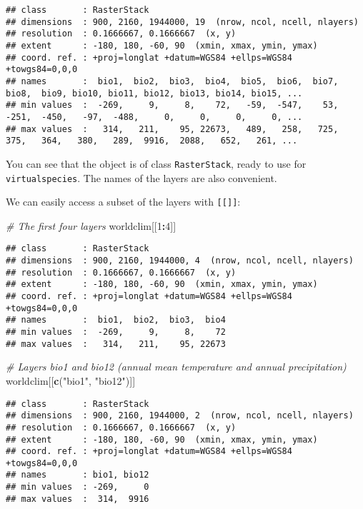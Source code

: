 \documentclass[]{article}
\newenvironment{Shaded}{\begin{snugshade}}{\end{snugshade}}
\newcommand{\KeywordTok}[1]{\textcolor[rgb]{0.13,0.29,0.53}{\textbf{#1}}}
\newcommand{\DecValTok}[1]{\textcolor[rgb]{0.00,0.00,0.81}{#1}}
\newcommand{\StringTok}[1]{\textcolor[rgb]{0.31,0.60,0.02}{#1}}
\newcommand{\CommentTok}[1]{\textcolor[rgb]{0.56,0.35,0.01}{\textit{#1}}}
\newcommand{\OperatorTok}[1]{\textcolor[rgb]{0.81,0.36,0.00}{\textbf{#1}}}
\newcommand{\NormalTok}[1]{#1}
\begin{document}
\begin{verbatim}
## class       : RasterStack 
## dimensions  : 900, 2160, 1944000, 19  (nrow, ncol, ncell, nlayers)
## resolution  : 0.1666667, 0.1666667  (x, y)
## extent      : -180, 180, -60, 90  (xmin, xmax, ymin, ymax)
## coord. ref. : +proj=longlat +datum=WGS84 +ellps=WGS84 +towgs84=0,0,0 
## names       :  bio1,  bio2,  bio3,  bio4,  bio5,  bio6,  bio7,  bio8,  bio9, bio10, bio11, bio12, bio13, bio14, bio15, ... 
## min values  :  -269,     9,     8,    72,   -59,  -547,    53,  -251,  -450,   -97,  -488,     0,     0,     0,     0, ... 
## max values  :   314,   211,    95, 22673,   489,   258,   725,   375,   364,   380,   289,  9916,  2088,   652,   261, ...
\end{verbatim}

You can see that the object is of class \texttt{RasterStack}, ready to
use for \texttt{virtualspecies}. The names of the layers are also
convenient.

We can easily access a subset of the layers with \texttt{{[}{[}{]}{]}}:

\begin{Shaded}
\begin{Highlighting}[]
\CommentTok{# The first four layers}
\NormalTok{worldclim[[}\DecValTok{1}\OperatorTok{:}\DecValTok{4}\NormalTok{]]}
\end{Highlighting}
\end{Shaded}

\begin{verbatim}
## class       : RasterStack 
## dimensions  : 900, 2160, 1944000, 4  (nrow, ncol, ncell, nlayers)
## resolution  : 0.1666667, 0.1666667  (x, y)
## extent      : -180, 180, -60, 90  (xmin, xmax, ymin, ymax)
## coord. ref. : +proj=longlat +datum=WGS84 +ellps=WGS84 +towgs84=0,0,0 
## names       :  bio1,  bio2,  bio3,  bio4 
## min values  :  -269,     9,     8,    72 
## max values  :   314,   211,    95, 22673
\end{verbatim}

\begin{Shaded}
\begin{Highlighting}[]
\CommentTok{# Layers bio1 and bio12 (annual mean temperature and annual precipitation)}
\NormalTok{worldclim[[}\KeywordTok{c}\NormalTok{(}\StringTok{"bio1"}\NormalTok{, }\StringTok{"bio12"}\NormalTok{)]]}
\end{Highlighting}
\end{Shaded}

\begin{verbatim}
## class       : RasterStack 
## dimensions  : 900, 2160, 1944000, 2  (nrow, ncol, ncell, nlayers)
## resolution  : 0.1666667, 0.1666667  (x, y)
## extent      : -180, 180, -60, 90  (xmin, xmax, ymin, ymax)
## coord. ref. : +proj=longlat +datum=WGS84 +ellps=WGS84 +towgs84=0,0,0 
## names       : bio1, bio12 
## min values  : -269,     0 
## max values  :  314,  9916
\end{verbatim}
\end{document}
